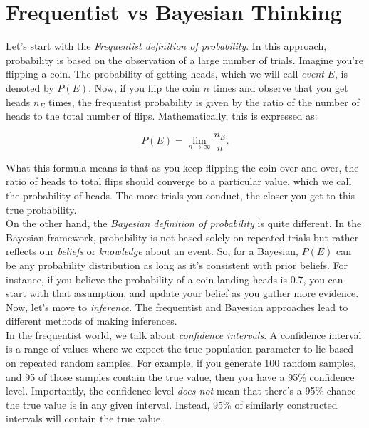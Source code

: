 \section{Frequentist vs Bayesian Thinking}

Let's start with the \textit{Frequentist definition of probability}. In this approach, probability is based on the observation of a large number of trials. Imagine you're flipping a coin. The probability of getting heads, which we will call \textit{event} \(E\), is denoted by \(P(E)\). Now, if you flip the coin \(n\) times and observe that you get heads \(n_E\) times, the frequentist probability is given by the ratio of the number of heads to the total number of flips. Mathematically, this is expressed as:

\[
P(E) = \lim_{n \to \infty} \frac{n_E}{n}.
\]

What this formula means is that as you keep flipping the coin over and over, the ratio of heads to total flips should converge to a particular value, which we call the probability of heads. The more trials you conduct, the closer you get to this true probability.\\

On the other hand, the \textit{Bayesian definition of probability} is quite different. In the Bayesian framework, probability is not based solely on repeated trials but rather reflects our \textit{beliefs} or \textit{knowledge} about an event. So, for a Bayesian, \(P(E)\) can be any probability distribution as long as it's consistent with prior beliefs. For instance, if you believe the probability of a coin landing heads is 0.7, you can start with that assumption, and update your belief as you gather more evidence.\\

Now, let's move to \textit{inference}. The frequentist and Bayesian approaches lead to different methods of making inferences.\\

In the frequentist world, we talk about \textit{confidence intervals}. A confidence interval is a range of values where we expect the true population parameter to lie based on repeated random samples. For example, if you generate 100 random samples, and 95 of those samples contain the true value, then you have a 95\% confidence level. Importantly, the confidence level \textit{does not} mean that there's a 95\% chance the true value is in any given interval. Instead, 95\% of similarly constructed intervals will contain the true value.\\

